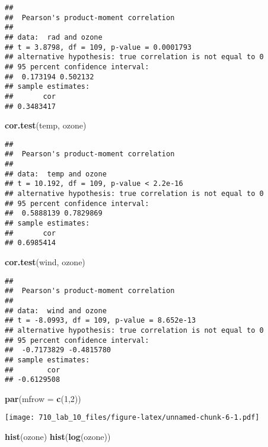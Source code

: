 \documentclass[]{article}
\newenvironment{Shaded}{\begin{snugshade}}{\end{snugshade}}
\newcommand{\KeywordTok}[1]{\textcolor[rgb]{0.13,0.29,0.53}{\textbf{#1}}}
\newcommand{\DataTypeTok}[1]{\textcolor[rgb]{0.13,0.29,0.53}{#1}}
\newcommand{\DecValTok}[1]{\textcolor[rgb]{0.00,0.00,0.81}{#1}}
\newcommand{\NormalTok}[1]{#1}
\begin{document}
\begin{verbatim}
## 
##  Pearson's product-moment correlation
## 
## data:  rad and ozone
## t = 3.8798, df = 109, p-value = 0.0001793
## alternative hypothesis: true correlation is not equal to 0
## 95 percent confidence interval:
##  0.173194 0.502132
## sample estimates:
##       cor 
## 0.3483417
\end{verbatim}

\begin{Shaded}
\begin{Highlighting}[]
\KeywordTok{cor.test}\NormalTok{(temp, ozone)}
\end{Highlighting}
\end{Shaded}

\begin{verbatim}
## 
##  Pearson's product-moment correlation
## 
## data:  temp and ozone
## t = 10.192, df = 109, p-value < 2.2e-16
## alternative hypothesis: true correlation is not equal to 0
## 95 percent confidence interval:
##  0.5888139 0.7829869
## sample estimates:
##       cor 
## 0.6985414
\end{verbatim}

\begin{Shaded}
\begin{Highlighting}[]
\KeywordTok{cor.test}\NormalTok{(wind, ozone)}
\end{Highlighting}
\end{Shaded}

\begin{verbatim}
## 
##  Pearson's product-moment correlation
## 
## data:  wind and ozone
## t = -8.0993, df = 109, p-value = 8.652e-13
## alternative hypothesis: true correlation is not equal to 0
## 95 percent confidence interval:
##  -0.7173829 -0.4815780
## sample estimates:
##        cor 
## -0.6129508
\end{verbatim}

\begin{Shaded}
\begin{Highlighting}[]
\KeywordTok{par}\NormalTok{(}\DataTypeTok{mfrow =} \KeywordTok{c}\NormalTok{(}\DecValTok{1}\NormalTok{,}\DecValTok{2}\NormalTok{))}
\end{Highlighting}
\end{Shaded}

\texttt{[image: 710\_lab\_10\_files/figure-latex/unnamed-chunk-6-1.pdf]}

\begin{Shaded}
\begin{Highlighting}[]
\KeywordTok{hist}\NormalTok{(ozone)}
\KeywordTok{hist}\NormalTok{(}\KeywordTok{log}\NormalTok{(ozone))}
\end{Highlighting}
\end{Shaded}
\end{document}
